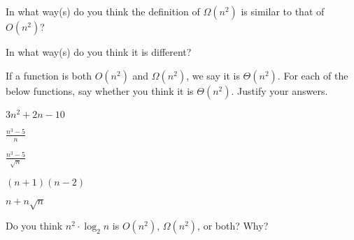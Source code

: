 \documentclass{tufte-handout}
\begin{document}
\begin{questions}
\item In what way(s) do you think the definition of $\Omega(n^2)$ is similar to
  that of $O(n^2)$?
\item In what way(s) do you think it is different?
\item If a function is both $O(n^2)$ and $\Omega(n^2)$, we say it is
  $\Theta(n^2)$.
  For each of the below functions, say whether you
  think it is $\Theta(n^2)$.  Justify your answers.
  \begin{subquestions}
  \item $3n^2 + 2n - 10$
  \item $\displaystyle \frac{n^3 - 5}{n}$
  \item $\displaystyle \frac{n^3 - 5}{\sqrt n}$
  \item $(n+1)(n-2)$
  \item $n + n \sqrt n$
  \end{subquestions}
\item Do you think $n^2 \cdot \log_2 n$ is $O(n^2)$, $\Omega(n^2)$, or
  both?  Why?
\end{questions}
\end{document}
